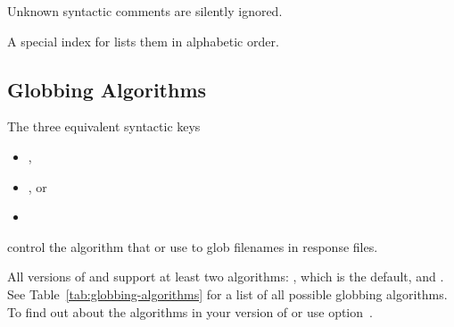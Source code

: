 Unknown syntactic comments are silently ignored.

A special index for  lists them in alphabetic order.


\subsection[Globbing Algorithms]{Globbing Algorithms
  \label{sec:globbing-algorithms}
  }

The three equivalent syntactic keys

\begin{itemize}
\item
  ,

\item
  , or

\item
\end{itemize}

control the algorithm that  or
 use to glob filenames in response files.

All versions of  and  support
at least two algorithms: , which is the default, and
. See
Table~\ref{tab:globbing-algorithms} for a list of all possible
globbing algorithms.  To find out about the algorithms in your version
of  or  use
option~.

